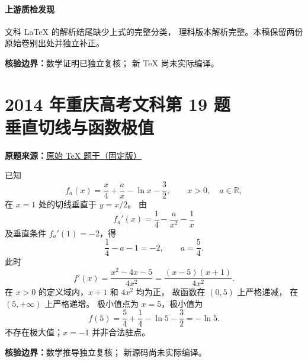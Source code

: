\documentclass[UTF8,a4paper,11pt]{ctexart}
\begin{document}
\paragraph{上游质检发现}
文科 LaTeX 的解析结尾缺少上式的完整分类，
理科版本解析完整。本稿保留两份原始卷别出处并独立补正。

\noindent\textbf{核验边界：}数学证明已独立复核；
新 TeX 尚未实际编译。

\clearpage
{}
{}
\section*{2014 年重庆高考文科第 19 题\\垂直切线与函数极值}
\noindent\textbf{原题来源：}\href{https://github.com/DxAThing/Gaokao-Math-Problems-Compilation/blob/f1ae169b58a75b3db6e35c670b3f0d5c78718188/content/2014/chongqing_liberal.tex#L560}{原始 TeX 题干（固定版）}

已知
\[
 f_a(x)=\frac{x}{4}+\frac{a}{x}-\ln x-\frac32,
 \qquad x>0,\quad a\in\mathbb R,
\]
在 $x=1$ 处的切线垂直于 $y=x/2$。
由
\[
 f_a'(x)=\frac14-\frac{a}{x^2}-\frac1x
\]
及垂直条件 $f_a'(1)=-2$，得
\[
 \frac14-a-1=-2,\qquad \boxed{a=\frac54}.
\]
此时
\[
 f'(x)=\frac{x^2-4x-5}{4x^2}
 =\frac{(x-5)(x+1)}{4x^2}.
\]
在 $x>0$ 的定义域内，$x+1$ 和 $4x^2$ 均为正，
故函数在 $(0,5)$ 上严格递减，
在 $(5,+\infty)$ 上严格递增。
极小值点为 $x=5$，极小值为
\[
 \boxed{f(5)=\frac54+\frac14-\ln5-\frac32=-\ln5}.
\]
不存在极大值；$x=-1$ 并非合法驻点。

\noindent\textbf{核验边界：}数学推导独立复核；
新源码尚未实际编译。

\clearpage
{}
{}
\end{document}
